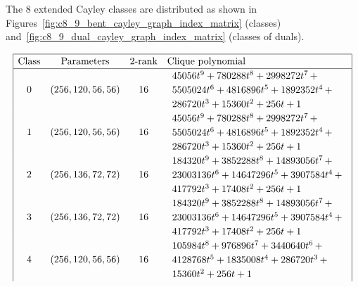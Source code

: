 The 8 extended Cayley classes are distributed
as shown in Figures~\ref{fig:c8_9_bent_cayley_graph_index_matrix} (classes) and~\ref{fig:c8_9_dual_cayley_graph_index_matrix}
(classes of duals).

\begin{table}[!bhpt] %
\small{}
\begin{align*}
\def\arraystretch{1.2}
\begin{array}{|cccl|}
\hline
\text{Class} &
\text{Parameters} &
\text{2-rank} &
\text{Clique polynomial}
\\
\hline
0 &
(256, 120, 56, 56) &
16 &
\begin{array}{l}
45056t^{9} + 780288t^{8} + 2998272t^{7}
\,+
\\
 5505024t^{6} + 4816896t^{5} + 1892352t^{4}
\,+
\\
 286720t^{3} + 15360t^{2} + 256t + 1
\end{array}
\\
1 &
(256, 120, 56, 56) &
16 &
\begin{array}{l}
45056t^{9} + 780288t^{8} + 2998272t^{7}
\,+
\\
 5505024t^{6} + 4816896t^{5} + 1892352t^{4}
\,+
\\
 286720t^{3} + 15360t^{2} + 256t + 1
\end{array}
\\
2 &
(256, 136, 72, 72) &
16 &
\begin{array}{l}
184320t^{9} + 3852288t^{8} + 14893056t^{7}
\,+
\\
 23003136t^{6} + 14647296t^{5} + 3907584t^{4}
\,+
\\
 417792t^{3} + 17408t^{2} + 256t + 1
\end{array}
\\
3 &
(256, 136, 72, 72) &
16 &
\begin{array}{l}
184320t^{9} + 3852288t^{8} + 14893056t^{7}
\,+
\\
 23003136t^{6} + 14647296t^{5} + 3907584t^{4}
\,+
\\
 417792t^{3} + 17408t^{2} + 256t + 1
\end{array}
\\
4 &
(256, 120, 56, 56) &
16 &
\begin{array}{l}
105984t^{8} + 976896t^{7} + 3440640t^{6}
\,+
\\
 4128768t^{5} + 1835008t^{4} + 286720t^{3}
\,+
\\
 15360t^{2} + 256t + 1
\end{array}
\\

\end{array}
\end{align*}
\end{table}

